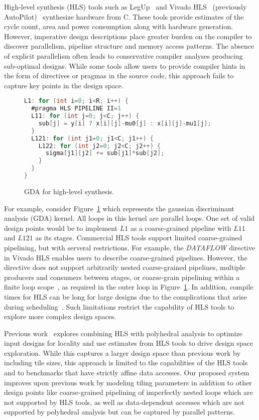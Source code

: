 High-level synthesis (HLS) tools such as LegUp~\cite{legup-tecs} and Vivado HLS~\cite{vivadohls} (previously AutoPilot)~\cite{cong11hls}
synthesize hardware from C. These tools provide estimates of the cycle count, area and power consumption
along with hardware generation. However, imperative design descriptions place greater burden on
the compiler to discover parallelism, pipeline structure and memory access patterns.
The absence of explicit parallelism often leads to conservative compiler analyses
producing sub-optimal designs. While some tools allow users to provide compiler
hints in the form of directives or pragmas in the source code, this approach
fails to capture key points in the design space.
\begin{figure}[ht]
\begin{lstlisting}[mathescape=true, numbers=none, language=C]
L1: for (int i=0; i<R; i++) {
  #pragma HLS PIPELINE II=1
  L11: for (int j=0; j<C; j++) {
    sub[j] = y[i] ? x[i][j]-mu0[j] : x[i][j]-mu1[j];
  }
  L121: for (int j1=0; j1<C; j1++) {
    L122: for (int j2=0; j2<C; j2++) {
      sigma[j1][j2] += sub[j1]*sub[j2];
    }
  }
}
\end{lstlisting}
\caption{GDA for high-level synthesis.}
\label{fig:gda-hls}
\end{figure}
For example, consider Figure~\ref{fig:gda-hls} which represents the gaussian discriminant analysis (GDA)
kernel. All loops in this kernel are parallel loops. One set of valid design points would be to implement $L1$
as a coarse-grained pipeline with $L11$ and $L121$ as its stages. Commercial HLS tools support
 limited coarse-grained pipelining, but with serveral restrictions. For example,
the \emph{DATAFLOW} directive in Vivado HLS enables users to describe coarse-grained pipelines.
However, the directive does not support arbitrarily nested coarse-grained pipelines,
multiple producers and consumers between stages, or coarse-grain pipelining within a finite loop scope~\cite{vivadohls_ug}, as required in the outer loop in Figure~\ref{fig:gda-hls}.
In addition, compile times for HLS can be long for large designs due to the complications that
arise during scheduling~\cite{Aladdin}.
Such limitations restrict the capability of HLS tools to explore more complex design spaces.

Previous work~\cite{pouchet13fpga}
explores combining HLS with polyhedral analysis to optimize input designs for locality
and use estimates from HLS tools to drive design space exploration. While this captures a larger design
space than previous work by including tile sizes, this approach is limited to the capabilities
of the HLS tools and to benchmarks that have strictly affine data accesses. Our proposed system improves
upon previous work by modeling tiling
parameters in addition to other design points like coarse-grained pipelining of imperfectly nested loops
which are not supported by HLS tools, as well as data-dependent accesses which are not supported by polyhedral analysis but can be captured by parallel patterns.

